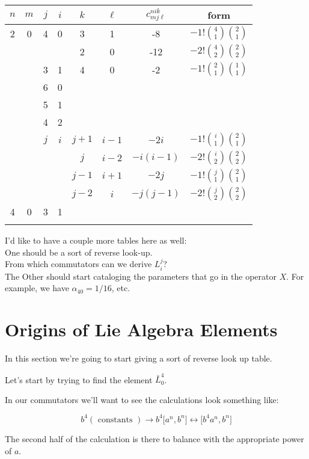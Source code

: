 \documentclass{article}
\newcommand{\lrbrack}[2]{\lbrack #1 , #2 \rbrack}
\newcommand{\cc}[3]{{#1}!{#2 \choose #1}{#3 \choose #1}}
\begin{document}
\begin{center}
\begin{tabular}{c | c | c | c | c | c | c | c }
$n$ & $m$ & $j$ & $i$ & $k$ & $\ell$ & $c_{mj\ell}^{nik}$ & form\\
\hline
2 & 0 & 4 & 0 & 3 & 1 & -8 & $-\cc{1}{4}{2}$\\
  &   &   &   & 2 & 0 & -12& $-\cc{2}{4}{2}$\\
  &   & 3 & 1 & 4 & 0 & -2 & $-\cc{1}{2}{1}$\\
  &   & 6 & 0 &   &   &  &\\
  &   & 5 & 1 &   &   &  &\\
  &   & 4 & 2 &   &   &  &\\
  & & $j$ & $i$ & $j+1$ & $i-1$  & $-2i$ & $-\cc{1}{i}{2}$\\
  & & &  & $j$  & $i-2$ & $-i(i-1)$ & $-\cc{2}{i}{2}$\\
  & & & & $j-1$  & $i+1$  & $-2j$ & $-\cc{1}{j}{2}$\\
  & & & & $j-2$  & $i$  & $-j(j-1)$ & $-\cc{2}{j}{2}$ \\
4 & 0 & 3 & 1 &   &   &  &\\
  &   &   &   &   &   &  &\\
\end{tabular}	
\end{center}		
	
I'd like to have a couple more tables here as well:\\
One should be a sort of reverse look-up.\\
From which commutators can we derive $L_i^j$?\\
The Other should start cataloging the parameters that go in the operator $X$.  For example, we have $\alpha_{40}=1/16$, etc.	


\section*{Origins of Lie Algebra Elements}

In this section we're going to start giving a sort of reverse look up table.  

Let's start by trying to find the element $\bar{L}_0^4$.

In our commutators we'll want to see the calculations look something like:

\[
b^4 ( \textrm{ constants }) \rightarrow b^4 \lrbrack{a^n}{b^n} \leftrightarrow \lrbrack{b^4 a^n}{b^n}
\]

The second half of the calculation is there to balance with the appropriate power of $a$.  
\end{document}
